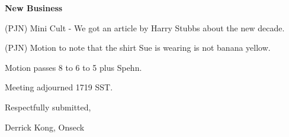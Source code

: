 \vspace{0.15in}
{\bf New Business}

(PJN) Mini Cult - We got an article by Harry Stubbs about the new
decade.

(PJN) Motion to note that the shirt Sue is wearing is not banana
yellow.

Motion passes 8 to 6 to 5 plus Spehn.

Meeting adjourned 1719 SST.

\vspace{0.15in}
\begin{center}
Respectfully submitted,

Derrick Kong, Onseck
\end{center}

